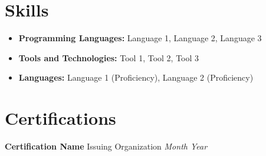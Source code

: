 \documentclass[a4paper,12pt]{article}
\begin{document}
\section*{Skills}
\begin{itemize}
    \item \textbf{Programming Languages:} Language 1, Language 2, Language 3
    \item \textbf{Tools and Technologies:} Tool 1, Tool 2, Tool 3
    \item \textbf{Languages:} Language 1 (Proficiency), Language 2 (Proficiency)
\end{itemize}

\section*{Certifications}
\noindent
\textbf{Certification Name} \hfill Issuing Organization \newline
\textit{Month Year}
\end{document}
